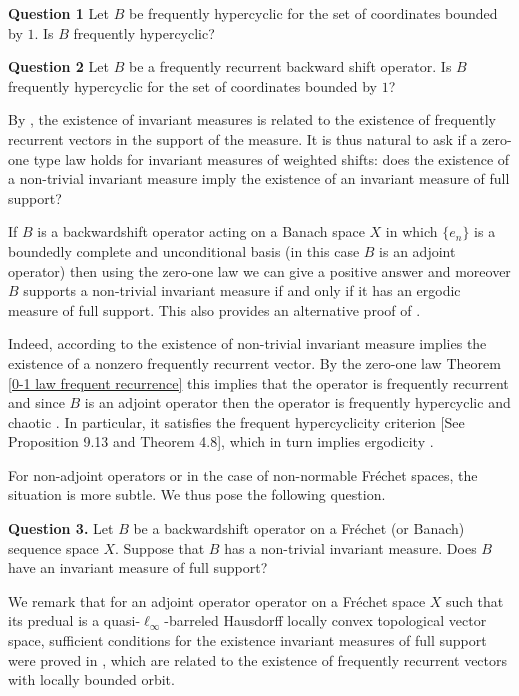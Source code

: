 \documentclass[11pt]{amsart}
\begin{document}
\textbf{Question 1} Let $B$ be frequently hypercyclic for the set of coordinates bounded by $1$. Is $B$ frequently hypercyclic?

\textbf{Question 2} Let $B$ be a frequently recurrent backward shift operator. Is $B$ frequently hypercyclic for the set of coordinates bounded by $1$?



By \cite{GriLop23}, the existence of invariant measures is related to the existence of frequently recurrent vectors in the support of the measure.
It is thus natural to ask if a zero-one type law
holds for invariant measures of weighted shifts: does the existence of a non-trivial invariant measure imply the existence of an invariant measure of full support? 

If $B$ is a backwardshift operator acting on a Banach space $X$ in which $\{e_n\}$ is a boundedly complete and unconditional basis (in this case $B$ is an adjoint operator) then using the zero-one law we can give a positive answer and moreover
$B$ supports a non-trivial invariant measure  if and only if it has an ergodic measure of full support.
This also provides an alternative proof of  \cite[Proposition 2.1]{grivaux2024orthogonality}.

Indeed, according to \cite[Lemma 3.1]{GriLop23} the existence of non-trivial invariant measure implies the existence of a nonzero frequently recurrent vector. By the zero-one law Theorem \ref{0-1 law frequent recurrence} this implies that the operator is frequently recurrent and since $B$ is an adjoint operator then the operator is frequently hypercyclic and chaotic \cite[Theorem 2.1]{charpentier2019chaos}. In particular, it satisfies the frequent hypercyclicity criterion \cite{GroPer11}[See Proposition 9.13 and Theorem 4.8], which in turn implies ergodicity \cite[Theorem 1]{MurPer13}.

For non-adjoint operators or in the case of non-normable Fr\'echet spaces, the situation is more subtle. 
We thus pose the following question.

\textbf{Question 3.} Let $B$ be a backwardshift operator on a Fr\'echet (or Banach) sequence space $X$. Suppose that $B$ has a non-trivial invariant measure. Does $B$ have an invariant measure of full support?



We remark that for an adjoint operator operator on a Fr\'echet space $X$ such that its predual is a quasi-$\ell_\infty$-barreled Hausdorff locally convex topological vector space, sufficient conditions for the existence invariant measures of full support were proved in \cite[Theorem 2.3]{Lop24Locallybounded}, which are related to the existence of frequently recurrent vectors with locally bounded orbit.
\end{document}
